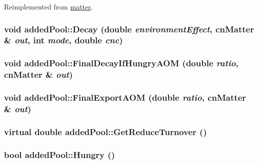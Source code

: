Reimplemented from \hyperlink{classmatter_afca594a86c75c8f40856bc5c8711266c}{matter}.\hypertarget{classadded_pool_a6bc59f070b765a1fbbb1d24d17882b33}{
\subsubsection[{Decay}]{\setlength{\rightskip}{0pt plus 5cm}void addedPool::Decay (double {\em environmentEffect}, \/  {\bf cnMatter} \& {\em out}, \/  int {\em mode}, \/  double {\em cnc})}}
\label{classadded_pool_a6bc59f070b765a1fbbb1d24d17882b33}
\hypertarget{classadded_pool_ac19f010f6512bfb4f8ffaa9071e1251d}{
\subsubsection[{FinalDecayIfHungryAOM}]{\setlength{\rightskip}{0pt plus 5cm}void addedPool::FinalDecayIfHungryAOM (double {\em ratio}, \/  {\bf cnMatter} \& {\em out})}}
\label{classadded_pool_ac19f010f6512bfb4f8ffaa9071e1251d}
\hypertarget{classadded_pool_a6c1df7303f53a6c6693a371f0a0f760a}{
\subsubsection[{FinalExportAOM}]{\setlength{\rightskip}{0pt plus 5cm}void addedPool::FinalExportAOM (double {\em ratio}, \/  {\bf cnMatter} \& {\em out})}}
\label{classadded_pool_a6c1df7303f53a6c6693a371f0a0f760a}
\hypertarget{classadded_pool_a751b3e1eab19b4b6efc87c160e79a016}{
\subsubsection[{GetReduceTurnover}]{\setlength{\rightskip}{0pt plus 5cm}virtual double addedPool::GetReduceTurnover ()}}
\label{classadded_pool_a751b3e1eab19b4b6efc87c160e79a016}
\hypertarget{classadded_pool_afec00b85b540b1d368dd51e1528e6aba}{
\subsubsection[{Hungry}]{\setlength{\rightskip}{0pt plus 5cm}bool addedPool::Hungry ()}}
\label{classadded_pool_afec00b85b540b1d368dd51e1528e6aba}


